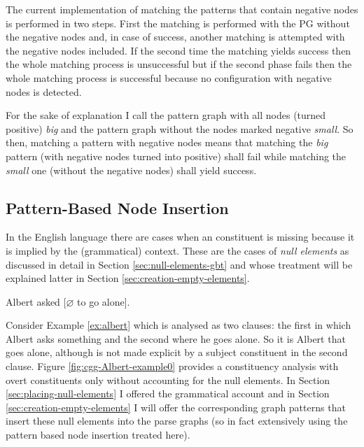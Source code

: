 The current implementation of matching the patterns that contain negative nodes is performed in two steps. First the matching is performed with the PG without the negative nodes and, in case of success, another matching is attempted with the negative nodes included. If the second time the matching yields success then the whole matching process is unsuccessful but if the second phase fails then the whole matching process is successful because no configuration with negative nodes is detected.

For the sake of explanation I call the pattern graph with all nodes (turned positive) \textit{big} and the pattern graph without the nodes marked negative \textit{small}. So then, matching a pattern with negative nodes means that matching the \textit{big} pattern (with negative nodes turned into positive) shall fail while matching the \textit{small} one (without the negative nodes) shall yield success.

%
\subsection{Pattern-Based Node Insertion} 
In the English language there are cases when an constituent is missing because it is implied by the (grammatical) context. These are the cases of \textit{null elements} as discussed in detail in Section \ref{sec:null-elements-gbt} and whose treatment will be explained latter in Section \ref{sec:creation-empty-elements}.

\begin{exe}
	\ex\label{ex:albert} Albert asked [$\varnothing$ to go alone].
\end{exe}

Consider Example \ref{ex:albert} which is analysed as two clauses: the first in which Albert asks something and the second where he goes alone. So it is Albert that goes alone, although is not made explicit by a subject constituent in the second clause. Figure \ref{fig:cgg-Albert-example0} provides a constituency analysis with overt constituents only without accounting for the null elements. In Section \ref{sec:placing-null-elements} I offered the grammatical account and in Section \ref{sec:creation-empty-elements} I will offer the corresponding graph patterns that insert these null elements into the parse graphs (so in fact extensively using the pattern based node insertion treated here).

